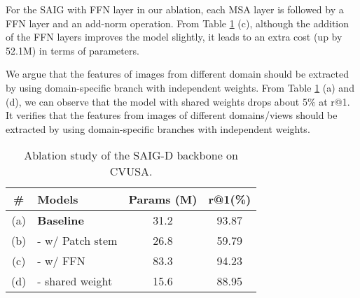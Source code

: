 \documentclass[sn-basic,iicol]{sn-jnl}
\theoremstyle{thmstyletwo}\newtheorem{example}{Example}\newtheorem{remark}{Remark}
\theoremstyle{thmstylethree}\newtheorem{definition}{Definition}
\begin{document}
 For the SAIG with FFN layer in our ablation, each MSA layer is followed by a FFN layer and an add-norm operation. From Table \ref{ablation experiment} (c), although the addition of the FFN layers improves the model slightly, it leads to an extra cost (up by 52.1M) in terms of parameters.



 We argue that the features of images from different domain should be extracted by using domain-specific branch with independent weights. From Table \ref{ablation experiment} (a) and (d), we can observe that the model with shared weights drops about 5\% at r@1. It verifies that the features from images of different domains/views should be extracted by using domain-specific branches with independent weights. 


\begin{table}[htbp]
\setlength{\abovecaptionskip}{0.2cm}
\centering
\begin{tabular}{cl|c|c}
\toprule
\# & Models & Params (M)& r@1(\%) \\ \midrule
(a) & \textbf{Baseline} & 31.2& 93.87 \\
(b) & {- w/ Patch stem} & 26.8 & 59.79\\
(c) & {- w/ FFN} & 83.3 & 94.23\\
(d) & {- shared weight} &15.6 & 88.95\\
\bottomrule
\end{tabular}
\caption{Ablation study of the SAIG-D backbone on CVUSA.}
\label{ablation experiment}
\vspace{-5pt}
\end{table}
\end{document}
